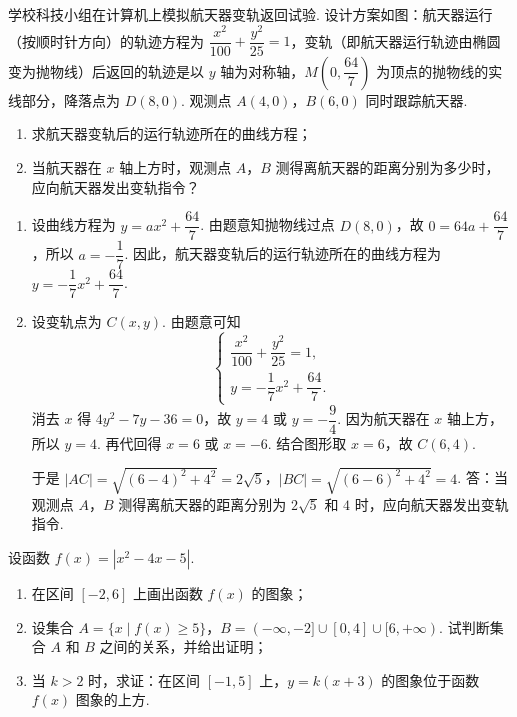 \begin{problem}
学校科技小组在计算机上模拟航天器变轨返回试验. 设计方案如图：航天器运行（按顺时针方向）的轨迹方程为 \(\dfrac{x^2}{100}+\dfrac{y^2}{25}=1\)，变轨（即航天器运行轨迹由椭圆变为抛物线）后返回的轨迹是以 \(y\) 轴为对称轴，\(M\left(0,\dfrac{64}{7}\right)\) 为顶点的抛物线的实线部分，降落点为 \(D(8,0)\). 观测点 \(A(4,0)\)，\(B(6,0)\) 同时跟踪航天器.

\begin{enumerate}
\item 求航天器变轨后的运行轨迹所在的曲线方程；
\item 当航天器在 \(x\) 轴上方时，观测点 \(A\)，\(B\) 测得离航天器的距离分别为多少时，应向航天器发出变轨指令？
\end{enumerate}

\end{problem}

\begin{solution}
\begin{enumerate}
\item 设曲线方程为 \(y=ax^2+\dfrac{64}{7}\). 由题意知抛物线过点 \(D(8,0)\)，故 \(0=64a+\dfrac{64}{7}\)，所以 \(a=-\dfrac17\). 因此，航天器变轨后的运行轨迹所在的曲线方程为 \(y=-\dfrac17x^2+\dfrac{64}{7}\).
\end{enumerate}

\FloatBarrier

\begin{enumerate}
\setcounter{enumi}{1}
\item 设变轨点为 \(C(x,y)\). 由题意可知
\[
\begin{cases}
\dfrac{x^2}{100}+\dfrac{y^2}{25}=1,\\
y=-\dfrac17x^2+\dfrac{64}{7}.
\end{cases}
\]
消去 \(x\) 得 \(4y^2-7y-36=0\)，故 \(y=4\) 或 \(y=-\dfrac94\). 因为航天器在 \(x\) 轴上方，所以 \(y=4\). 再代回得 \(x=6\) 或 \(x=-6\). 结合图形取 \(x=6\)，故 \(C(6,4)\).

于是 \(|AC|=\sqrt{(6-4)^2+4^2}=2\sqrt5\)，\(|BC|=\sqrt{(6-6)^2+4^2}=4\).
答：当观测点 \(A\)，\(B\) 测得离航天器的距离分别为 \(2\sqrt5\) 和 \(4\) 时，应向航天器发出变轨指令.
\end{enumerate}
\end{solution}

\begin{problem}
设函数 \(f(x)=|x^2-4x-5|\).

\begin{enumerate}
\item 在区间 \([-2,6]\) 上画出函数 \(f(x)\) 的图象；
\item 设集合 \(A=\{x\mid f(x)\ge5\}\)，\(B=(-\infty,-2]\cup[0,4]\cup[6,+\infty)\). 试判断集合 \(A\) 和 \(B\) 之间的关系，并给出证明；
\item 当 \(k>2\) 时，求证：在区间 \([-1,5]\) 上，\(y=k(x+3)\) 的图象位于函数 \(f(x)\) 图象的上方.
\end{enumerate}

\end{problem}

